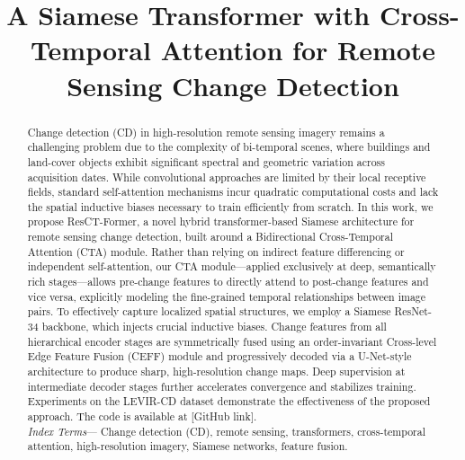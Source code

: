 \documentclass[conference]{IEEEtran}
\begin{document}
\title{A Siamese Transformer with Cross-Temporal Attention for Remote Sensing Change Detection}

\author{
    \and
}

\maketitle

\begin{abstract}
Change detection (CD) in high-resolution remote sensing imagery remains a challenging problem due to the complexity of bi-temporal scenes, where buildings and land-cover objects exhibit significant spectral and geometric variation across acquisition dates. While convolutional approaches are limited by their local receptive fields, standard self-attention mechanisms incur quadratic computational costs and lack the spatial inductive biases necessary to train efficiently from scratch. In this work, we propose ResCT-Former, a novel hybrid transformer-based Siamese architecture for remote sensing change detection, built around a Bidirectional Cross-Temporal Attention (CTA) module. Rather than relying on indirect feature differencing or independent self-attention, our CTA module—applied exclusively at deep, semantically rich stages—allows pre-change features to directly attend to post-change features and vice versa, explicitly modeling the fine-grained temporal relationships between image pairs. To effectively capture localized spatial structures, we employ a Siamese ResNet-34 backbone, which injects crucial inductive biases. Change features from all hierarchical encoder stages are symmetrically fused using an order-invariant Cross-level Edge Feature Fusion (CEFF) module and progressively decoded via a U-Net-style architecture to produce sharp, high-resolution change maps. Deep supervision at intermediate decoder stages further accelerates convergence and stabilizes training. Experiments on the LEVIR-CD dataset demonstrate the effectiveness of the proposed approach. The code is available at [GitHub link].\\

\textit{Index Terms}— Change detection (CD), remote sensing, transformers, cross-temporal attention, high-resolution imagery, Siamese networks, feature fusion.
\end{abstract}
\end{document}
